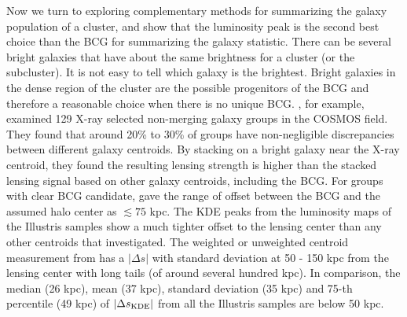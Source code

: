 Now we turn to exploring complementary methods for summarizing
the galaxy population of a cluster, and show that  the luminosity peak 
is the second best choice than the BCG for summarizing the galaxy statistic.
There can be several bright galaxies that have about the same brightness 
for a cluster (or the subcluster). It is not easy to tell which galaxy is the
brightest.  
Bright galaxies in the dense region of the cluster are the possible progenitors 
of the BCG and therefore a reasonable choice when there is no unique BCG. 
\cite{George2012a}, for example, examined 129 X-ray selected non-merging galaxy 
groups in the COSMOS field.
They found that around 20\% to 30\% of groups have non-negligible discrepancies
between different galaxy centroids. 
By stacking on a bright galaxy near the X-ray centroid, they found  
the resulting lensing strength is higher than the stacked lensing signal based
on other galaxy centroids, including the BCG. 
For groups with clear BCG candidate, \cite{George2012a} gave the range of
offset between the BCG and the assumed halo center as $\lesssim 75$ kpc. 
The KDE peaks from the luminosity maps of the Illustris samples show a much 
tighter offset to the 
lensing center than any other centroids that \cite{George2012a} investigated. 
The weighted or unweighted centroid measurement from \cite{George2012a} has a 
$|\Delta s|$ with standard deviation at 50 - 150 kpc from the
lensing center with long tails (of around several hundred kpc). 
In comparison, the median (26 kpc), mean (37 kpc), standard deviation (35 kpc) 
and 75-th percentile (49 kpc) of 
$|\Delta s_{\rm KDE}|$ from all the Illustris samples are below 50 kpc. 


